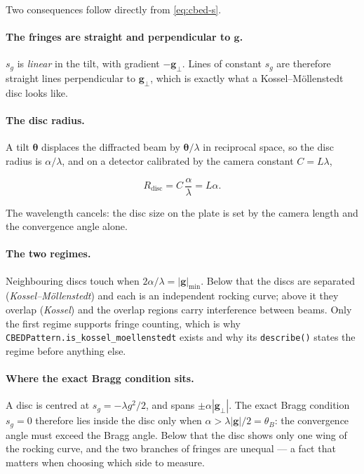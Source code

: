 Two consequences follow directly from \eqref{eq:cbed-s}.

\paragraph{The fringes are straight and perpendicular to \(\mathbf{g}\).} \(s_g\) is
\emph{linear} in the tilt, with gradient \(-\mathbf{g}_\perp\). Lines of constant \(s_g\)
are therefore straight lines perpendicular to \(\mathbf{g}_\perp\), which is exactly what a
Kossel--M\"ollenstedt disc looks like.

\paragraph{The disc radius.} A tilt \(\boldsymbol{\theta}\) displaces the diffracted beam
by \(\boldsymbol{\theta}/\lambda\) in reciprocal space, so the disc radius is
\(\alpha/\lambda\), and on a detector calibrated by the camera constant \(C = L\lambda\),

\begin{equation}
  R_{\text{disc}} = C\,\frac{\alpha}{\lambda} = L\alpha .
\end{equation}

The wavelength cancels: the disc size on the plate is set by the camera length and the
convergence angle alone.

\paragraph{The two regimes.} Neighbouring discs touch when
\(2\alpha/\lambda = |\mathbf{g}|_{\min}\). Below that the discs are separated
(\emph{Kossel--M\"ollenstedt}) and each is an independent rocking curve; above it they
overlap (\emph{Kossel}) and the overlap regions carry interference between beams. Only the
first regime supports fringe counting, which is why
\texttt{CBEDPattern.is\_kossel\_moellenstedt} exists and why its
\texttt{describe()} states the regime before anything else.

\paragraph{Where the exact Bragg condition sits.} A disc is centred at
\(s_g = -\lambda g^{2}/2\), and spans \(\pm\alpha|\mathbf{g}_\perp|\). The exact Bragg
condition \(s_g = 0\) therefore lies inside the disc only when
\(\alpha > \lambda|\mathbf{g}|/2 = \theta_{B}\): the convergence angle must exceed the Bragg
angle. Below that the disc shows only one wing of the rocking curve, and the two branches
of fringes are unequal --- a fact that matters when choosing which side to measure.

